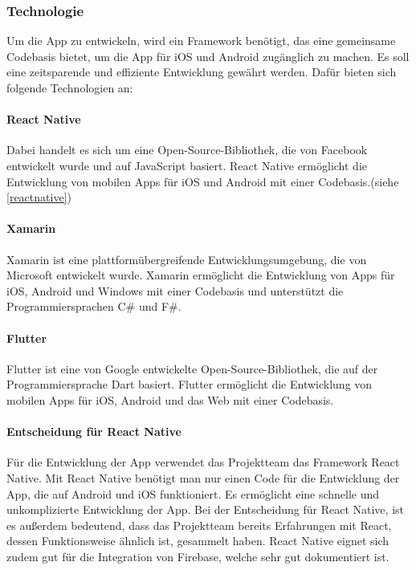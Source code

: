\subsubsection{Technologie}
Um die App zu entwickeln, wird ein \Gls{Framework} benötigt, das eine gemeinsame Codebasis bietet, um die App für iOS und Android zugänglich zu machen. Es soll eine zeitsparende und effiziente Entwicklung gewährt werden. Dafür bieten sich folgende Technologien an:\\

\paragraph{React Native}Dabei handelt es sich um eine \Gls{Open-Source}-Bibliothek, die von Facebook entwickelt wurde und auf JavaScript basiert. React Native ermöglicht die Entwicklung von mobilen Apps für iOS und Android mit einer Codebasis.(siehe \ref*{reactnative})
\paragraph{Xamarin} Xamarin ist eine plattformübergreifende Entwicklungsumgebung, die von Microsoft entwickelt wurde. Xamarin ermöglicht die Entwicklung von Apps für iOS, Android und Windows mit einer Codebasis und unterstützt die Programmiersprachen C\# und F\#. 
\paragraph{Flutter} Flutter ist eine von Google entwickelte \Gls{Open-Source}-Bibliothek, die auf der Programmiersprache Dart basiert. Flutter ermöglicht die Entwicklung von mobilen Apps für iOS, Android und das Web mit einer Codebasis. 


\paragraph{Entscheidung für React Native}Für die Entwicklung der App verwendet das Projektteam das \Gls{Framework} React Native. Mit React Native benötigt man nur einen Code für die Entwicklung der App, die auf Android und iOS funktioniert. Es ermöglicht eine schnelle und unkomplizierte Entwicklung der App. Bei der Entscheidung für React Native, ist es außerdem bedeutend, dass das Projektteam bereits Erfahrungen mit React, dessen Funktionsweise ähnlich ist, gesammelt haben. React Native eignet sich zudem gut für die Integration von Firebase, welche sehr gut dokumentiert ist. \\

